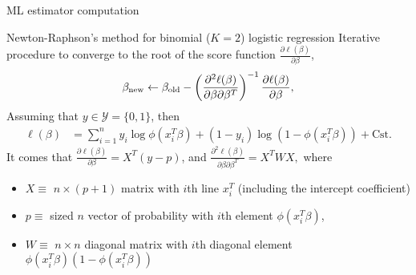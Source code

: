 \documentclass[compress, smaller, serif, 9pt]{beamer}
\begin{document}
\begin{frame}{ML estimator computation}

\begin{block}{Newton-Raphson's method for binomial ($K=2$) logistic regression}
 Iterative procedure to converge to the root of the score function $\frac{ \partial \ell(\beta) }{ \partial \beta }$, \vspace{-2mm}
 \begin{align*}
  \beta_{\textrm{new}} \leftarrow \beta_{\textrm{old}} - \left( \frac{ \partial^2 \ell(\beta) }{ \partial \beta \partial \beta^T } \right)^{-1} \frac{\partial\ell(\beta)}{\partial \beta},\vspace{-3mm}
 \end{align*} 
 Assuming that $y\in \mathcal{Y}=\{0,1\}$, then
  \begin{align*}
   \ell(\beta) &= \sum_{i=1}^n y_i \log \phi(x_i^T \beta) + (1-y_i) \log \left(1 - \phi(x_i^T \beta) \right)+\textrm{Cst}.
  \end{align*}
 It comes that $\frac{\partial\ell(\beta)}{\partial \beta}  =  X^T (y-p)$, and 
  $ \frac{ \partial^2 \ell(\beta) }{ \partial \beta \partial \beta^T } =  X^T W X,$ where
 \begin{itemize}
  \item $X \equiv$ $n\times(p+1)$ matrix with $i$th line $x_i^T$ (including the intercept coefficient)
  \item $p \equiv$ sized $n$ vector of probability with $i$th element $\phi(x_i^T \beta)$,
  \item $W\equiv$  $n\times n$ diagonal matrix with $i$th diagonal element $\phi(x_i^T \beta)  \left(1-\phi(x_i^T \beta) \right)$
 \end{itemize}
 \end{block}
 

\end{frame}
\end{document}

